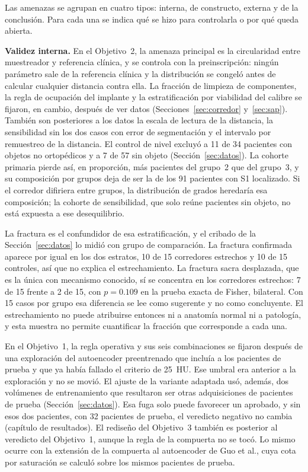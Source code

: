 Las amenazas se agrupan en cuatro tipos: interna, de constructo, externa y de la conclusión. Para cada una se indica qué se hizo para controlarla o por qué queda abierta.

\textbf{Validez interna.} En el Objetivo~2, la amenaza principal es la circularidad entre muestreador y referencia clínica, y se controla con la preinscripción: ningún parámetro sale de la referencia clínica y la distribución se congeló antes de calcular cualquier distancia contra ella. La fracción de limpieza de componentes, la regla de ocupación del implante y la estratificación por viabilidad del calibre se fijaron, en cambio, después de ver datos (Secciones~\ref{sec:corredor} y~\ref{sec:sap}). También son posteriores a los datos la escala de lectura de la distancia, la sensibilidad sin los dos casos con error de segmentación y el intervalo por remuestreo de la distancia. El control de nivel excluyó a 11 de 34 pacientes con objetos no ortopédicos y a 7 de 57 sin objeto (Sección~\ref{sec:datos}). La cohorte primaria pierde así, en proporción, más pacientes del grupo~2 que del grupo~3, y su composición por grupos deja de ser la de los 91 pacientes con S1 localizado. Si el corredor difiriera entre grupos, la distribución de grados heredaría esa composición; la cohorte de sensibilidad, que solo reúne pacientes sin objeto, no está expuesta a ese desequilibrio.

La fractura es el confundidor de esa estratificación, y el cribado de la Sección~\ref{sec:datos} lo midió con grupo de comparación. La fractura confirmada aparece por igual en los dos estratos, 10 de 15 corredores estrechos y 10 de 15 controles, así que no explica el estrechamiento. La fractura sacra desplazada, que es la única con mecanismo conocido, sí se concentra en los corredores estrechos: 7 de 15 frente a 2 de 15, con $p = 0.109$ en la prueba exacta de Fisher, bilateral. Con 15 casos por grupo esa diferencia se lee como sugerente y no como concluyente. El estrechamiento no puede atribuirse entonces ni a anatomía normal ni a patología, y esta muestra no permite cuantificar la fracción que corresponde a cada una.

En el Objetivo~1, la regla operativa y sus seis combinaciones se fijaron después de una exploración del autoencoder preentrenado que incluía a los pacientes de prueba y que ya había fallado el criterio de 25~HU. Ese umbral era anterior a la exploración y no se movió. El ajuste de la variante adaptada usó, además, dos volúmenes de entrenamiento que resultaron ser otras adquisiciones de pacientes de prueba (Sección~\ref{sec:datos}). Esa fuga solo puede favorecer un aprobado, y sin esos dos pacientes, con 32 pacientes de prueba, el veredicto negativo no cambia (capítulo de resultados). El rediseño del Objetivo~3 también es posterior al veredicto del Objetivo~1, aunque la regla de la compuerta no se tocó. Lo mismo ocurre con la extensión de la compuerta al autoencoder de Guo et al., cuya cota por saturación se calculó sobre los mismos pacientes de prueba.

